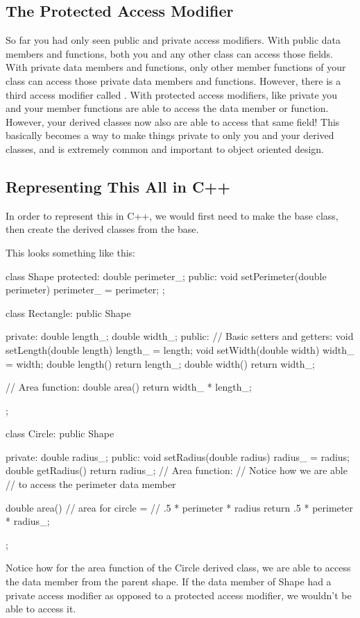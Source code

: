 \documentclass{tufte-handout}
\begin{document}
\subsection{The Protected Access Modifier}
So far you had only seen public and private access modifiers.
With public data members and functions, both you and any other class can access those fields.
With private data members and functions, only other member functions of your class can access those private data members and functions.
However, there is a third access modifier called .
With protected access modifiers, like private you and your member functions are able to access the data member or function.
However, your derived classes now also are able to access that same field!
This basically becomes a way to make things private to only you and your derived classes, and is extremely common and important to object oriented design.

\subsection{Representing This All in C++}
In order to represent this in C++, we would first need to make the  base class, then create the derived classes from the  base.

This looks something like this:

\begin{Code}
class Shape{
    protected:
        double perimeter_;
    public:
        void setPerimeter(double perimeter){
            perimeter_ = perimeter;
        }
};

class Rectangle: public Shape {
    private:
        double length_;
        double width_;
    public:
        // Basic setters and getters:
        void setLength(double length){
            length_ = length;
        }
        void setWidth(double width){
            width_ = width;
        }
        double length(){
            return length_;
        }
        double width(){
            return width_;
        }
        
        // Area function:
        double area(){
            return width_ * length_;
        }
        
};

class Circle: public Shape {
    private:
        double radius_;
    public:
        void setRadius(double radius){
            radius_ = radius;
        }
        double getRadius(){
            return radius_;
        }
        // Area function:
        // Notice how we are able
        // to access the perimeter data member
        
        double area(){
            // area for circle = 
            // .5 * perimeter * radius
            return .5 * perimeter * radius_;
        }
};
            
\end{Code}
Notice how for the area function of the Circle derived class, we are able to access the  data member from the parent shape.
If the  data member of Shape had a private access modifier as opposed to a protected access modifier, we wouldn't be able to access it.
\end{document}

